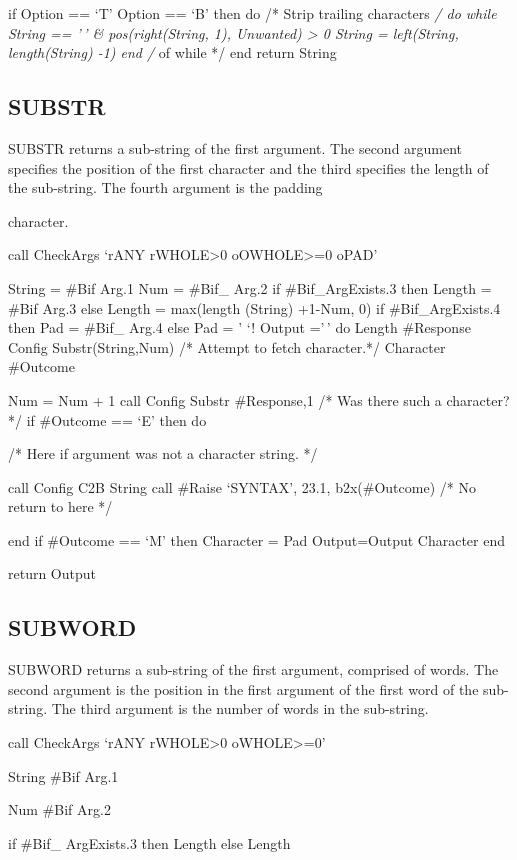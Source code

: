 if Option == `T' \textbar{} Option == `B' then do /* Strip trailing
characters \emph{/ do while String == '\,' \& pos(right(String, 1),
Unwanted) \textgreater{} 0 String = left(String, length(String) -1) end
/} of while */ end return String

\subsection{SUBSTR}\label{substr}

SUBSTR returns a sub-string of the first argument. The second argument
specifies the position of the first character and the third specifies
the length of the sub-string. The fourth argument is the padding

character.

call CheckArgs `rANY rWHOLE\textgreater0 oOWHOLE\textgreater=0 oPAD'

String = \#Bif Arg.1 Num = \#Bif\_ Arg.2 if \#Bif\_ArgExists.3 then
Length = \#Bif Arg.3 else Length = max(length (String) +1-Num, 0) if
\#Bif\_ArgExists.4 then Pad = \#Bif\_ Arg.4 else Pad = ' `! Output ='\,'
do Length \#Response Config Substr(String,Num) /* Attempt to fetch
character.*/ Character \#Outcome

Num = Num + 1 call Config Substr \#Response,1 /* Was there such a
character? */ if \#Outcome == `E' then do

/* Here if argument was not a character string. */

call Config C2B String call \#Raise `SYNTAX', 23.1, b2x(\#Outcome) /* No
return to here */

end if \#Outcome == `M' then Character = Pad Output=Output \textbar{}
\textbar{} Character end

return Output

\subsection{SUBWORD}\label{subword}

SUBWORD returns a sub-string of the first argument, comprised of words.
The second argument is the position in the first argument of the first
word of the sub-string. The third argument is the number of words in the
sub-string.

call CheckArgs `rANY rWHOLE\textgreater0 oWHOLE\textgreater=0'

String \#Bif Arg.1

Num \#Bif Arg.2

if \#Bif\_ ArgExists.3 then Length else Length

